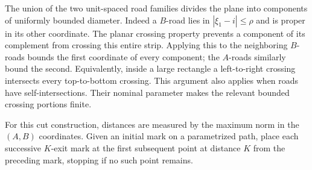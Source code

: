 The union of the two unit-spaced road families divides the plane into
components of uniformly bounded diameter.  Indeed a $B$-road lies in
$|\xi_1-i|\le\rho$ and is proper in its other coordinate.  The planar
crossing property prevents a component of its complement from crossing
this entire strip.  Applying this to the neighboring $B$-roads bounds
the first coordinate of every component; the $A$-roads similarly bound
the second.  Equivalently, inside a large rectangle a left-to-right
crossing intersects every top-to-bottom crossing.  This argument also
applies when roads have self-intersections.  Their nominal parameter
makes the relevant bounded crossing portions finite.

For this cut construction, distances are measured by the maximum norm
in the $(A,B)$ coordinates. Given an initial mark on a parametrized
path, place each successive $K$-exit mark at the first subsequent point
at distance $K$ from the preceding mark, stopping if no such point
remains.

